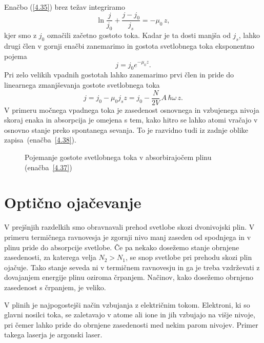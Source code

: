 Enačbo (\ref{4.35}) brez težav integriramo 
\begin{equation}
\ln\frac{j}{j_{0}}+\frac{j-j_{0}}{j_{s}}=-\mu_{0}\, z,
\label{4.37}
\end{equation}
kjer smo z $j_{0}$ označili začetno gostoto toka. Kadar je ta dosti
manjša od $j_{s}$, lahko drugi člen v gornji enačbi zanemarimo in gostota svetlobnega
toka eksponentno pojema
\begin{equation}
j = j_0 e^{-\mu_0 z}.
\end{equation}
Pri zelo velikih vpadnih gostotah lahko zanemarimo prvi člen in pride do 
linearnega zmanjševanja gostote svetlobnega toka
\begin{equation}
j=j_{0}-\mu_{0}j_{s}z = j_0 - \frac{N}{2V}\, A\, \hbar \omega\, z.
\label{4.38}
\end{equation}
V primeru močnega vpadnega toka je zasedenost osnovnega in vzbujenega nivoja skoraj
enaka in absorpcija je omejena s tem, kako hitro se lahko atomi vračajo
v osnovno stanje preko spontanega sevanja. To je razvidno tudi iz
zadnje oblike zapisa~(enačba~\ref{4.38}).

\begin{figure}[h]
\centering
\def\svgwidth{100truemm} 

\caption{Pojemanje gostote svetlobnega toka v absorbirajočem plinu (enačba~\ref{4.37})}
\label{fig:abs2}
\end{figure}

\section{Optično ojačevanje}
V prejšnjih razdelkih smo obravnavali prehod svetlobe skozi dvonivojski plin. V primeru
termičnega ravnovesja je zgornji nivo manj zaseden od spodnjega in v plinu pride
do absorpcije svetlobe. Če pa nekako dosežemo stanje obrnjene zasedenosti,
za katerega velja $N_{2}>N_{1}$, se snop svetlobe pri prehodu skozi plin ojačuje. 
Tako stanje seveda ni v termičnem ravnovesju in ga je treba vzdrževati z dovajanjem 
energije plinu oziroma črpanjem. 
Načinov, kako dosežemo obrnjeno zasedenost s črpanjem, je veliko.  

V plinih je najpogostejši način vzbujanja z električnim tokom. Elektroni,
ki so glavni nosilci toka, se zaletavajo v atome ali ione in jih vzbujajo
na višje nivoje, pri čemer lahko pride do obrnjene zasedenosti med
nekim parom nivojev. Primer takega laserja je argonski laser. 

